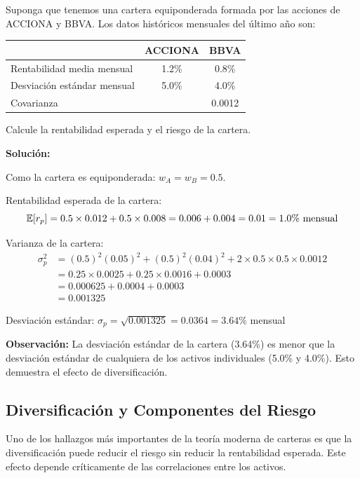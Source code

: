 \begin{ejemplo}
Suponga que tenemos una cartera equiponderada formada por las acciones de ACCIONA y BBVA. Los datos históricos mensuales del último año son:

\begin{center}
\begin{tabular}{lcc}
\toprule
& ACCIONA & BBVA \\
\midrule
Rentabilidad media mensual & 1.2\% & 0.8\% \\
Desviación estándar mensual & 5.0\% & 4.0\% \\
Covarianza & & 0.0012 \\
\bottomrule
\end{tabular}
\end{center}

Calcule la rentabilidad esperada y el riesgo de la cartera.

\textbf{Solución:}

Como la cartera es equiponderada: $w_A = w_B = 0.5$.

Rentabilidad esperada de la cartera:
$$\mathbb{E}[r_p] = 0.5 \times 0.012 + 0.5 \times 0.008 = 0.006 + 0.004 = 0.01 = 1.0\% \text{ mensual}$$

Varianza de la cartera:
\begin{align*}
\sigma_p^2 &= (0.5)^2 (0.05)^2 + (0.5)^2 (0.04)^2 + 2 \times 0.5 \times 0.5 \times 0.0012 \\
&= 0.25 \times 0.0025 + 0.25 \times 0.0016 + 0.0003 \\
&= 0.000625 + 0.0004 + 0.0003 \\
&= 0.001325
\end{align*}

Desviación estándar: $\sigma_p = \sqrt{0.001325} = 0.0364 = 3.64\%$ mensual

\textbf{Observación:} La desviación estándar de la cartera (3.64\%) es menor que la desviación estándar de cualquiera de los activos individuales (5.0\% y 4.0\%). Esto demuestra el efecto de diversificación.
\end{ejemplo}

\subsection{Diversificación y Componentes del Riesgo}

Uno de los hallazgos más importantes de la teoría moderna de carteras es que la diversificación puede reducir el riesgo sin reducir la rentabilidad esperada. Este efecto depende críticamente de las correlaciones entre los activos.

